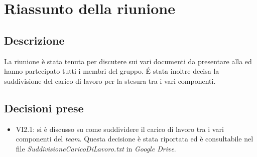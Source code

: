 \section{Riassunto della riunione}
\subsection{Descrizione}

La riunione è stata tenuta per discutere sui vari documenti da presentare alla \RR{} ed hanno partecipato tutti i membri del gruppo. \'E stata inoltre decisa la suddivisione del carico di lavoro per la stesura tra i vari componenti. 

\subsection{Decisioni prese}
\begin{itemize}
\item VI2.1: si è discusso su come suddividere il carico di lavoro tra i vari componenti del \textit{team}. Questa decisione è stata riportata ed è consultabile nel file \textit{SuddivisioneCaricoDiLavoro.txt} in \textit{Google Drive}.
\end{itemize}
